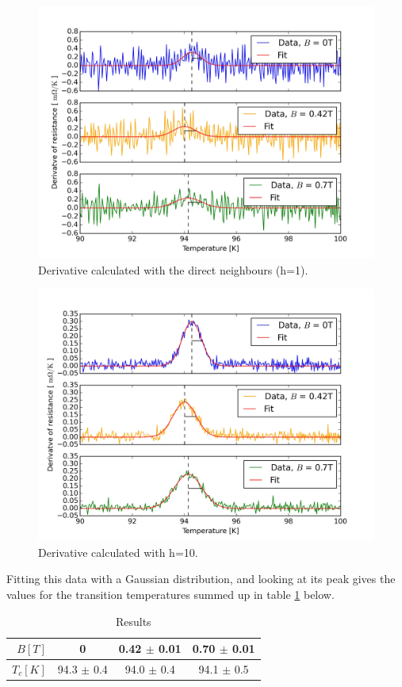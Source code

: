 \documentclass[a4paper,parskip,11pt, DIV12]{scrreprt}
\begin{document}
\begin{enumerate}
\begin{figure}[H]
\centering
\includegraphics[scale=0.1]{Criticaltemperature3}
\caption[]{Derivative calculated with the direct neighbours (h=1).  }
\label{h1}
\end{figure}
\begin{figure}[H]
\centering
\includegraphics[scale=0.1]{Criticaltemperature2}
\caption[]{Derivative calculated with h=10.}
\label{meanresist}
\end{figure}

Fitting this data with a Gaussian distribution, and looking at its peak gives the values for the transition temperatures summed up in table \ref{results} below.


\begin{table}[H]
\centering
\renewcommand{\arraystretch}{1.2} %
\setlength{\tabcolsep}{3mm} %
\footnotesize
\begin{tabular}{r|ccc}
$B[T]$ & 0 & 0.42 $\pm$ 0.01 & 0.70 $\pm$ 0.01 \\ 
\hline 
$T_{c} [K]$ & 94.3 $\pm$ 0.4 & 94.0 $\pm$ 0.4 & 94.1 $\pm$ 0.5 \\ 
\end{tabular}
\caption[]{Results}
\label{results}
\end{table} 
 



\end{enumerate}
\end{document}
